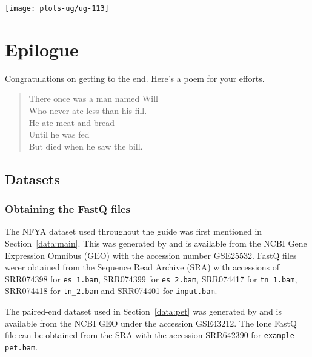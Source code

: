 \documentclass[12pt]{report}
\newcommand{\code}[1]{{\small\texttt{#1}}}
\newenvironment{combox}
{ \begin{shaded}\begin{center}\begin{minipage}[t]{0.95\textwidth} }
{ \end{minipage}\end{center}\end{shaded} }
\begin{document}
\begin{center}
\texttt{[image: plots-ug/ug-113]}
\end{center}



\chapter{Epilogue}

\begin{combox}
Congratulations on getting to the end. Here's a poem for your efforts.
\begin{quote}
There once was a man named Will \\
Who never ate less than his fill. \\
He ate meat and bread \\
Until he was fed \\
But died when he saw the bill. 
\end{quote}
\end{combox}

\section{Datasets}
\label{sec:dataset}

\subsection{Obtaining the FastQ files}
The NFYA dataset used throughout the guide was first mentioned in Section~\ref{data:main}. 
This was generated by \cite{tiwari2012} and is available from the NCBI Gene Expression Omnibus (GEO) with the accession number GSE25532. 
FastQ files werer obtained from the Sequence Read Archive (SRA) with accessions of SRR074398 for \code{es\_1.bam}, SRR074399 for \code{es\_2.bam}, SRR074417 for \code{tn\_1.bam}, SRR074418 for \code{tn\_2.bam} and SRR074401 for \code{input.bam}.

The paired-end dataset used in Section~\ref{data:pet} was generated by \cite{pal2013} and is available from the NCBI GEO under the accession GSE43212.
The lone FastQ file can be obtained from the SRA with the accession SRR642390 for \code{example-pet.bam}.
\end{document}
